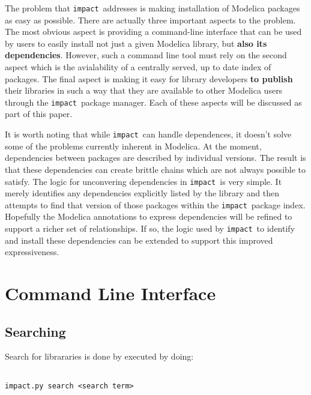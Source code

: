 \documentclass[11pt,a4paper,twocolumn]{article}
\newcommand{\impact}{\texttt{impact}} %
\begin{document}
The problem that \impact\ addresses is making installation of Modelica packages as 
easy as possible.  There are actually three important aspects to the problem.  The 
most obvious aspect is providing a command-line interface that can be used by 
users to easily install not just a given Modelica library, but \textbf{also its 
dependencies}.  However, such a command line tool must rely on the second aspect 
which is the avialability of a centrally served, up to date index of packages.  
The final aspect is making it easy for library developers \textbf{to publish} 
their libraries in such a way that they are available to other Modelica users 
through the \impact\ package manager.  Each of these aspects will be discussed as 
part of this paper.

It is worth noting that while \impact\ can handle dependences, it doesn't
solve some of the problems currently inherent in Modelica.  At the moment,
dependencies between packages are described by individual versions.  The
result is that these dependencies can create brittle chains which are not
always possible to satisfy. The logic for unconvering dependencies in \impact\
is very simple.  It merely identifies any dependencies explicitly listed by
the library and then attempts to find that version of those packages within
the \impact\ package index. Hopefully the Modelica annotations to express
dependencies will be refined to support a richer set of relationships.  If so,
the logic used by \impact\ to identify and install these dependencies can be
extended to support this improved expressiveness.

\section{Command Line Interface}
\label{sec:command_line}




\subsection{Searching} %
\label{cmd:search}

Search for librararies is done by executed by doing:
\lstset{language=bash}
\begin{lstlisting}[frame=shadowbox]  % Start your code-block

impact.py search <search term>
\end{lstlisting}
\end{document}
